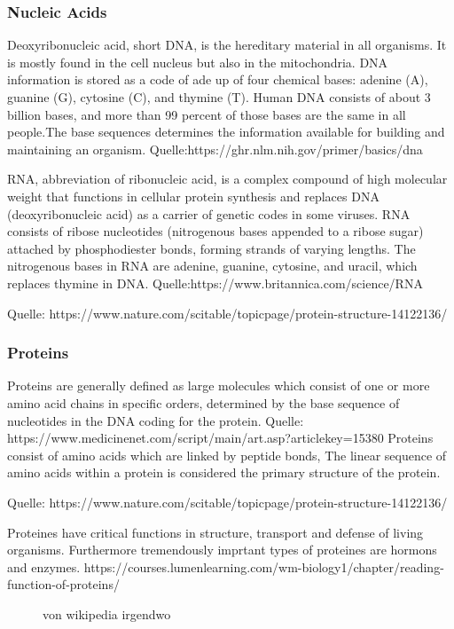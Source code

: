 \documentclass{egpubl}
\begin{document}
\subsubsection{Nucleic Acids}

 Deoxyribonucleic acid, short DNA, is the hereditary material in all organisms. It is mostly found in the cell nucleus but also in the mitochondria. DNA information is stored as a code of ade up of four chemical bases: adenine (A), guanine (G), cytosine (C), and thymine (T). Human DNA consists of about 3 billion bases, and more than 99 percent of those bases are the same in all people.The base sequences determines the information available for building and maintaining an organism.
 Quelle:https://ghr.nlm.nih.gov/primer/basics/dna
 
 RNA, abbreviation of ribonucleic acid, is a complex compound of high molecular weight that functions in cellular protein synthesis and replaces DNA (deoxyribonucleic acid) as a carrier of genetic codes in some viruses. RNA consists of ribose nucleotides (nitrogenous bases appended to a ribose sugar) attached by phosphodiester bonds, forming strands of varying lengths. The nitrogenous bases in RNA are adenine, guanine, cytosine, and uracil, which replaces thymine in DNA. Quelle:https://www.britannica.com/science/RNA
 
Quelle: https://www.nature.com/scitable/topicpage/protein-structure-14122136/
\subsubsection{Proteins}

Proteins are generally defined as large molecules which consist of one or more amino acid chains in specific orders, determined by the base sequence of nucleotides in the DNA coding for the protein.  
Quelle: https://www.medicinenet.com/script/main/art.asp?articlekey=15380
Proteins consist of amino acids which are linked by peptide bonds, The linear sequence of amino acids within a protein is considered the primary structure of the protein.

Quelle: https://www.nature.com/scitable/topicpage/protein-structure-14122136/

Proteines have critical functions in structure, transport and defense of living organisms. 
Furthermore tremendously imprtant types of proteines are hormons and enzymes.
https://courses.lumenlearning.com/wm-biology1/chapter/reading-function-of-proteins/
\begin{figure}[h]
von wikipedia irgendwo
\end{figure}
\end{document}
